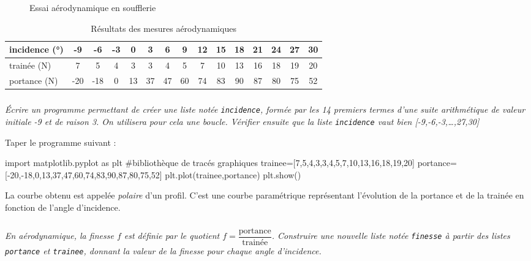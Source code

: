 \documentclass[10pt]{article}
\begin{document}
\begin{figure}[h]
\centering
\caption{Essai aérodynamique en soufflerie}\label{fig:profil-aile}
\end{figure}

\begin{table}[h]
\centering
\begin{tabular}{|l|c|c|c|c|c|c|c|c|c|c|c|c|c|c|}
\hline
incidence (°) & -9 & -6 & -3 & 0 & 3 & 6 & 9 & 12 & 15 & 18 & 21 & 24 & 27 & 30 \\
\hline
trainée (N) & 7 &5&4&3&3&4&5&7&10&13&16&18&19&20 \\
\hline
portance (N) &-20&-18&0&13&37&47&60&74&83&90&87&80&75&52\\
\hline
\end{tabular}
\caption{Résultats des mesures aérodynamiques}\label{tab:mesures-aero}
\end{table}




\subparagraph{}
\textit{\'Ecrire un programme permettant de créer une liste notée \texttt{incidence}, formée par les 14 premiers termes d'une suite arithmétique de valeur initiale -9 et de raison 3. On utilisera pour cela une boucle. Vérifier ensuite que la liste \texttt{incidence} vaut bien [-9,-6,-3,\ldots{},27,30]}



Taper le programme suivant :
\begin{py}
\begin{python}
import matplotlib.pyplot as plt			#bibliothèque de tracés graphiques
trainee=[7,5,4,3,3,4,5,7,10,13,16,18,19,20]
portance=[-20,-18,0,13,37,47,60,74,83,90,87,80,75,52]
plt.plot(trainee,portance)
plt.show()
\end{python}
\end{py}

\begin{rem}
La courbe obtenu est appelée \emph{polaire} d'un profil. C'est une courbe paramétrique représentant l'évolution de la portance et de la trainée en fonction de l'angle d'incidence.
\end{rem}

\subparagraph{}
\textit{En aérodynamique, la finesse $f$ est définie par le quotient $f=\dfrac{\text{portance}}{\text{trainée}}$. Construire une nouvelle liste notée \texttt{finesse} à partir des listes \texttt{portance} et \texttt{trainee}, donnant la valeur de la finesse pour chaque angle d'incidence.}
\end{document}

